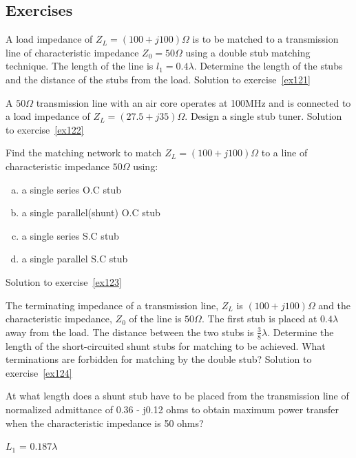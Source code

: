 \begin{mdframed}[ backgroundcolor=lightblue, linewidth=1pt, hidealllines=true]
\section*{Exercises}
\begin{ExerciseList}
\Exercise[label={ex121}]
A load impedance of $Z_{L} = (100 + j100)\Omega$ is to be matched to a transmission line of characteristic impedance $Z_0 = 50\Omega$ using a double stub matching technique. The length of the line is $l_{1} = 0.4\lambda$. Determine the length of the stubs and the distance of the stubs from the load.
\Answer[ref={ex121}]
Solution to exercise~\ref{ex121}

\Exercise[label={ex122}]
A $50\varOmega$ transmission line with an air core operates at 100MHz and is connected to a load impedance of $Z_L = (27.5 + j35)\varOmega$. Design a single stub tuner.
\Answer[ref={ex122}]
Solution to exercise~\ref{ex122}

\Exercise[label={ex123}]
Find the matching network to match $Z_L = (100 + j100)\varOmega$ to a line of characteristic impedance $50\varOmega$ using:
\begin{enumerate}[(a)]
\item a single series O.C stub
\item a single parallel(shunt) O.C stub
\item a single series S.C stub
\item a single parallel S.C stub
\end{enumerate}
\Answer[ref={ex123}]
Solution to exercise~\ref{ex123}

\Exercise[label={ex124}]
The terminating impedance of a transmission line, $Z_L$ is $(100 + j100)\varOmega$ and the characteristic impedance, $Z_0$ of the line is  $50\varOmega$. The first stub is placed at $0.4\lambda$ away from the load. The distance between the two stubs is $\frac{3}{8}\lambda$. Determine the length of the short-circuited shunt stubs for matching to be achieved. What terminations are forbidden for matching by the double stub?
\Answer[ref={ex124}]
Solution to exercise~\ref{ex124}

\Exercise[label={ex125}] 
At what length does a shunt stub have to be placed from the transmission line of normalized admittance of 0.36 - j0.12 ohms to obtain maximum power transfer when the characteristic impedance is 50 ohms?
\Answer[ref={ex125}]

$L_1$ = $0.187\lambda$


\end{ExerciseList}
\end{mdframed}
